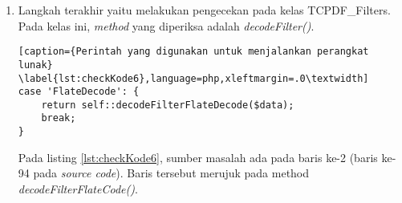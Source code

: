 \begin{enumerate}
	Pada listing \ref{lst:checkKode3}, sumber masalah berada pada baris ke-5 (baris ke-123 pada \textit{source code}). Baris tersebut merujuk pada method \textit{getIndirectObject()} yang ada pada kelas yang sama.
	
\begin{lstlisting}[caption={Perintah yang digunakan untuk menjalankan perangkat lunak}	\label{lst:checkKode4},language=php,xleftmargin=.0\textwidth]
if ($decoding AND ($element[0] == 'stream') AND (isset($objdata[($i - 1)][0])) AND ($objdata[($i - 1)][0] == '<<')) {
	echo "start";	
	$element[3] = $this->decodeStream($objdata[($i - 1)][1], $element[1]);
	echo "stop";
}
\end{lstlisting}

	Pada listing \ref{lst:checkKode4}, sumber masalah berada pada baris ke-4 (baris ke-702 pada \textit{source code}). Baris tersebut merujuk pada \textit{method decodeStream()} yang ada pada kelas yang sama.
	
\begin{lstlisting}[caption={Perintah yang digunakan untuk menjalankan perangkat lunak}	\label{lst:checkKode5},language=php,xleftmargin=.0\textwidth]
try {
	echo "start";
	$stream = TCPDF_FILTERS::decodeFilter($filter, $stream);
	echo "stop";
} catch (Exception $e) {
	$emsg = $e->getMessage();
	if ((($emsg[0] == '~') AND !$this >cfg['ignore_missing_filter_decoders']) OR (($emsg[0] != '~') AND !$this->cfg['ignore_filter_decoding_errors'])) {
		$this->Error($e->getMessage());
	}
}
\end{lstlisting}
	
	Pada listing \ref{lst:checkKode5}, sumber masalah berada pada baris ke-3 (baris ke-781 pada \textit{source code}). Baris tersebut merujuk pada kelas TCPDF\_Filters.
	
	\item Langkah terakhir yaitu melakukan pengecekan pada kelas TCPDF\_Filters. Pada kelas ini, \textit{method} yang diperiksa adalah \textit{decodeFilter()}.
	
\begin{lstlisting}[caption={Perintah yang digunakan untuk menjalankan perangkat lunak}	\label{lst:checkKode6},language=php,xleftmargin=.0\textwidth]
case 'FlateDecode': {
	return self::decodeFilterFlateDecode($data);
	break;
}
\end{lstlisting}
	
	Pada listing \ref{lst:checkKode6}, sumber masalah ada pada baris ke-2 (baris ke-94 pada \textit{source code}). Baris tersebut merujuk pada method \textit{decodeFilterFlateCode()}.
	

\end{enumerate}
